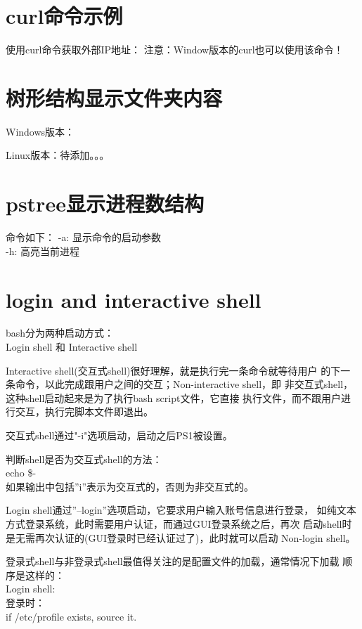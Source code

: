 ﻿\documentclass[a4paper,11pt]{article}
\begin{document}
  \section[curl命令示例]{curl命令示例}
  使用curl命令获取外部IP地址：
  注意：Window版本的curl也可以使用该命令！


  \section[树形结构显示文件夹内容]{树形结构显示文件夹内容}
  Windows版本：

  Linux版本：待添加。。。


  \section[pstree显示进程数结构]{pstree显示进程数结构}
  命令如下：
  -a: 显示命令的启动参数\\
  -h: 高亮当前进程


  \section[login and interactive shell]{login and interactive shell}
  bash分为两种启动方式：\\
  Login shell 和 Interactive shell

  Interactive shell(交互式shell)很好理解，就是执行完一条命令就等待用户
  的下一条命令，以此完成跟用户之间的交互；Non-interactive shell，即
  非交互式shell，这种shell启动起来是为了执行bash script文件，它直接
  执行文件，而不跟用户进行交互，执行完脚本文件即退出。

  交互式shell通过"-i"选项启动，启动之后PS1被设置。

  判断shell是否为交互式shell的方法：\\
  echo \$-\\
  如果输出中包括''i''表示为交互式的，否则为非交互式的。

  Login shell通过''--login''选项启动，它要求用户输入账号信息进行登录，
  如纯文本方式登录系统，此时需要用户认证，而通过GUI登录系统之后，再次
  启动shell时是无需再次认证的(GUI登录时已经认证过了)，此时就可以启动
  Non-login shell。

  登录式shell与非登录式shell最值得关注的是配置文件的加载，通常情况下加载
  顺序是这样的：\\
  Login shell:\\
  登录时：\\
  if /etc/profile exists, source it.
  
\end{document}
